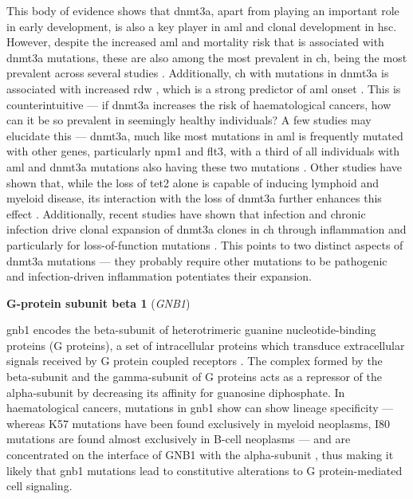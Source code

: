 This body of evidence shows that \ac{dnmt3a}, apart from playing an important role in early development, is also a key player in \ac{aml} and clonal development in \ac{hsc}. However, despite the increased \ac{aml} and mortality risk that is associated with \ac{dnmt3a} mutations, these are also among the most prevalent in \ac{ch}, being the most prevalent across several studies \cite{Jaiswal2014-rl,Genovese2014-eu,Zink2017-zi,Xie2014-np,Zehir2017-gh}. Additionally, \ac{ch} with mutations in \ac{dnmt3a} is associated with increased \ac{rdw} \cite{Dawoud2020-af}, which is a strong predictor of \ac{aml} onset \cite{Abelson2018-wh}. This is counterintuitive --- if \ac{dnmt3a} increases the risk of haematological cancers, how can it be so prevalent in seemingly healthy individuals? A few studies may elucidate this --- \ac{dnmt3a}, much like most mutations in \ac{aml} is frequently mutated with other genes, particularly \ac{npm1} and \ac{flt3}, with a third of all individuals with \ac{aml} and \ac{dnmt3a} mutations also having these two mutations \cite{noauthor_2013-ti,Bezerra2020-zc}. Other studies have shown that, while the loss of \ac{tet2} alone is capable of inducing lymphoid and myeloid disease, its interaction with the loss of \ac{dnmt3a} further enhances this effect \cite{Zhang2016-ys}. Additionally, recent studies have shown that infection and chronic infection drive clonal expansion of \ac{dnmt3a} clones in \ac{ch} through inflammation and particularly for loss-of-function mutations \cite{Hormaechea_Agulla2019-cd,Hormaechea-Agulla2021-kr}. This points to two distinct aspects of \ac{dnmt3a} mutations --- they probably require other mutations to be pathogenic and infection-driven inflammation potentiates their expansion.

\noindent \textbf{G-protein  subunit  beta  1 } (\textit{GNB1})

\Ac{gnb1} encodes the beta-subunit of heterotrimeric guanine nucleotide-binding proteins (G proteins), a set of intracellular proteins which transduce extracellular signals received by G protein coupled receptors \cite{Hurowitz2000-nk}. The complex formed by the beta-subunit and the gamma-subunit of G proteins acts as a repressor of the alpha-subunit by decreasing its affinity for guanosine diphosphate. In haematological cancers, mutations in \ac{gnb1} show can show lineage specificity --- whereas K57 mutations have been found exclusively in myeloid neoplasms, I80 mutations are found almost exclusively in B-cell neoplasms --- and are concentrated on the interface of GNB1 with the alpha-subunit \cite{Yoda2015-eq}, thus making it likely that \ac{gnb1} mutations lead to constitutive alterations to G protein-mediated cell signaling. 

